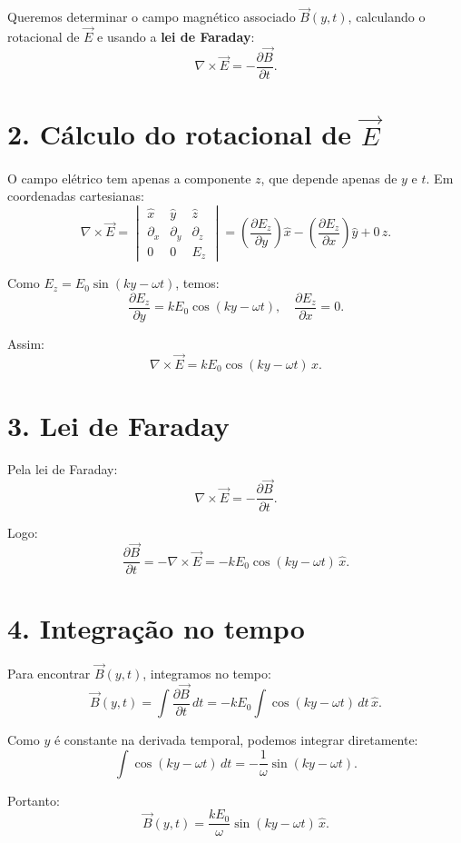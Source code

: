 \begin{flushleft}
Queremos determinar o campo magnético associado \(\vec{B}(y,t)\), calculando o rotacional de \(\vec{E}\) e usando a \textbf{lei de Faraday}:
\[
\nabla \times \vec{E} = -\frac{\partial \vec{B}}{\partial t}.
\]

\section*{2. Cálculo do rotacional de \(\vec{E}\)}

O campo elétrico tem apenas a componente \(z\), que depende apenas de \(y\) e \(t\).  
Em coordenadas cartesianas:
\[
\nabla \times \vec{E} =
\begin{vmatrix}
\hat{x} & \hat{y} & \hat{z} \\[4pt]
\partial_x & \partial_y & \partial_z \\[4pt]
0 & 0 & E_z
\end{vmatrix}
=
\left( \frac{\partial E_z}{\partial y} \right) \hat{x} - \left( \frac{\partial E_z}{\partial x} \right) \hat{y} + 0 \, \hat{z}.
\]

Como \(E_z = E_0 \sin(k y - \omega t)\), temos:
\[
\frac{\partial E_z}{\partial y} = k E_0 \cos(k y - \omega t),
\quad
\frac{\partial E_z}{\partial x} = 0.
\]

Assim:
\[
\nabla \times \vec{E} = k E_0 \cos(k y - \omega t) \, \hat{x}.
\]

\section*{3. Lei de Faraday}

Pela lei de Faraday:
\[
\nabla \times \vec{E} = -\frac{\partial \vec{B}}{\partial t}.
\]

Logo:
\[
\frac{\partial \vec{B}}{\partial t} = -\nabla \times \vec{E} = -k E_0 \cos(k y - \omega t) \, \hat{x}.
\]

\section*{4. Integração no tempo}

Para encontrar \(\vec{B}(y,t)\), integramos no tempo:
\[
\vec{B}(y,t) = \int \frac{\partial \vec{B}}{\partial t} \, dt = -k E_0 \int \cos(k y - \omega t) \, dt \, \hat{x}.
\]

Como \(y\) é constante na derivada temporal, podemos integrar diretamente:
\[
\int \cos(k y - \omega t) \, dt = -\frac{1}{\omega} \sin(k y - \omega t).
\]

Portanto:
\[
\vec{B}(y,t) = \frac{k E_0}{\omega} \sin(k y - \omega t) \, \hat{x}.
\]


\end{flushleft}
